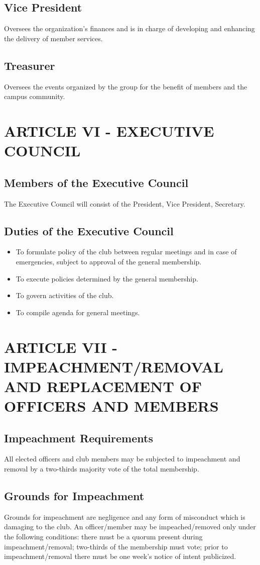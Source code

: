 \documentclass[11pt]{amsart}
\begin{document}
\subsection{Vice President}
Oversees the organization’s finances and is in charge of developing and enhancing the delivery of member services.
\subsection{Treasurer}
Oversees the events organized by the group for the benefit of members and the campus community.

\section{ARTICLE VI - EXECUTIVE COUNCIL}
\subsection{Members of the Executive Council}
The Executive Council will consist of the President, Vice President, Secretary.

\subsection{Duties of the Executive Council}
\begin{itemize}
\item{To formulate policy of the club between regular meetings and in case of emergencies, subject to approval of the general membership.}
\item{To execute policies determined by the general membership.}
\item{To govern activities of the club.}
\item{To compile agenda for general meetings.}
\end{itemize}

\section{ARTICLE VII - IMPEACHMENT/REMOVAL AND REPLACEMENT
OF OFFICERS AND MEMBERS}
\subsection{Impeachment Requirements}
All elected officers and club members may be subjected to impeachment and removal by a two-thirds majority vote of the total membership.
\subsection{Grounds for Impeachment}
Grounds for impeachment are negligence and any form of misconduct which is damaging to the club.  An officer/member may be impeached/removed only under the following conditions: there must be a quorum present during impeachment/removal; two-thirds of the membership must vote; prior to impeachment/removal there must be one week's notice of intent publicized.
\end{document}
